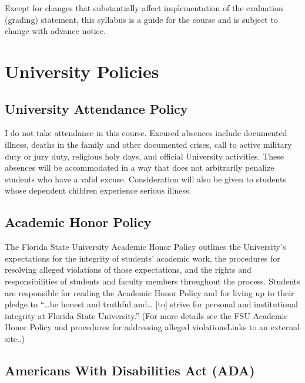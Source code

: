 \documentclass[10pt,]{article}
\begin{document}
Except for changes that substantially affect implementation of the
evaluation (grading) statement, this syllabus is a guide for the course
and is subject to change with advance notice.

\hypertarget{university-policies}{%
\section{University Policies}\label{university-policies}}

\hypertarget{university-attendance-policy}{%
\subsection{University Attendance
Policy}\label{university-attendance-policy}}

I do not take attendance in this course. Excused absences include
documented illness, deaths in the family and other documented crises,
call to active military duty or jury duty, religious holy days, and
official University activities. These absences will be accommodated in a
way that does not arbitrarily penalize students who have a valid excuse.
Consideration will also be given to students whose dependent children
experience serious illness.

\hypertarget{academic-honor-policy}{%
\subsection{Academic Honor Policy}\label{academic-honor-policy}}

The Florida State University Academic Honor Policy outlines the
University's expectations for the integrity of students' academic work,
the procedures for resolving alleged violations of those expectations,
and the rights and responsibilities of students and faculty members
throughout the process. Students are responsible for reading the
Academic Honor Policy and for living up to their pledge to ``\ldots be
honest and truthful and\ldots{} {[}to{]} strive for personal and
institutional integrity at Florida State University.'' (For more details
see the FSU Academic Honor Policy and procedures for addressing alleged
violationsLinks to an external site..)

\hypertarget{americans-with-disabilities-act-ada}{%
\subsection{Americans With Disabilities Act
(ADA)}\label{americans-with-disabilities-act-ada}}
\end{document}
